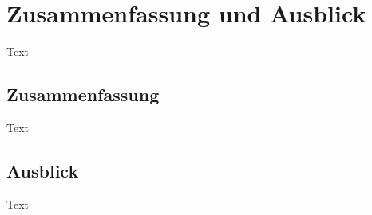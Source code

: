 \chapter{Zusammenfassung und Ausblick}
\label{chap:ende_zusammenfassung_ausblick}

   Text

   \section{Zusammenfassung}
   \label{sec:ende_zusammenfassung}
   
      Text

   \section{Ausblick}
   \label{sec:ende_ausblick}
   
      Text